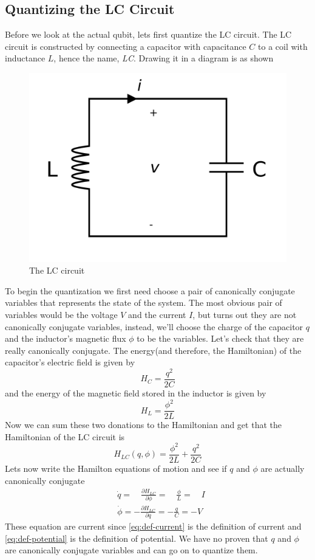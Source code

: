 \documentclass[english, a4paper, 12pt, twoside]{article}
\numberwithin{equation}{section} %
\begin{document}
\subsection{Quantizing the LC Circuit}
Before we look at the actual qubit, lets first quantize the LC circuit. The LC circuit is constructed by connecting a capacitor with capacitance $C$ to a coil with inductance $L$, hence the name, \textit{LC}. Drawing it in a diagram is as shown
\begin{figure}[H]
    \centering
    \includegraphics[width=0.5\columnwidth]{LC-circuit.png}
    \caption{The LC circuit} 
    \label{fig:LC-circuit}
\end{figure}

To begin the quantization we first need choose a pair of canonically conjugate variables that represents the state of the system. The most obvious pair of variables would be the voltage $V$ and the current $I$, but turns out they are not canonically conjugate variables, instead, we'll choose the charge of the capacitor $q$ and the inductor's magnetic flux $\phi$ to be the variables. 
Let's check that they are really canonically conjugate. The energy(and therefore, the Hamiltonian) of the capacitor's electric field is given by
\[
    H_C = \frac{q^2}{2C}
\]
and the energy of the magnetic field stored in the inductor is given by
\[
    H_L = \frac{\phi^2}{2L}
\]
Now we can sum these two donations to the Hamiltonian and get that the Hamiltonian of the LC circuit is
\[
    H_{LC}(q, \phi) = \frac{\phi^2}{2L} + \frac{q^2}{2C}
\]
Lets now write the Hamilton equations of motion and see if $q$ and $\phi$ are actually canonically conjugate
\begin{align}
    &\dot{q} = \quad \frac{\partial H_{LC}}{\partial \phi} = \quad \frac{\phi}{L} = \quad I \label{eq:def-current}\\
    &\dot{\phi} = -\frac{\partial H_{LC}}{\partial q} = -\frac{q}{C} = -V \label{eq:def-potential}
\end{align}
These equation are current since \ref{eq:def-current} is the definition of current and \ref{eq:def-potential} is the definition of potential. We have no proven that $q$ and $\phi$ are canonically conjugate variables and can go on to quantize them.
\end{document}

